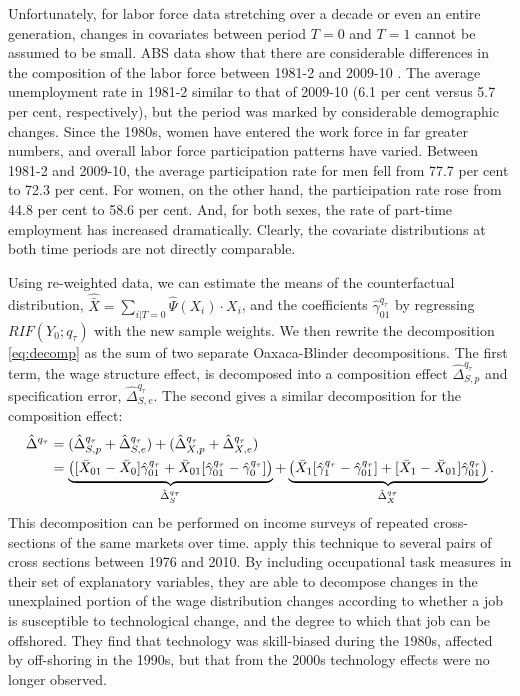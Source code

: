 Unfortunately, for labor force data stretching over a decade or even an entire generation, changes in covariates between period $T=0$ and $T=1$ cannot be assumed to be small. ABS data show that there are considerable differences in the composition of the labor force between 1981-2 and 2009-10 \citep{LFSApr2013}. The average unemployment rate in 1981-2 similar to that of 2009-10 (6.1 per cent versus 5.7 per cent, respectively), but the period was marked by considerable demographic changes. Since the 1980s, women have entered the work force in far greater numbers, and overall labor force participation patterns have varied. Between 1981-2 and 2009-10, the average participation rate for men fell from 77.7 per cent to 72.3 per cent. For women, on the other hand, the participation rate rose from 44.8 per cent to 58.6 per cent. And, for both sexes, the rate of part-time employment has increased dramatically. Clearly, the covariate distributions at both time periods are not directly comparable.

Using re-weighted data, we can estimate the means of the counterfactual distribution, $\hat{\bar{X}}=\sum_{i|T=0}\hat{\Psi}(X_i) \cdot X_i$, and the coefficients $\hat{\gamma}_{01}^{q_\tau}$ by regressing $RIF(Y_0;q_\tau)$ with the new sample weights. We then rewrite the decomposition \eqref{eq:decomp} as the sum of two separate Oaxaca-Blinder decompositions. The first term, the wage structure effect, is decomposed into a composition effect $\hat{\Delta}^{q_\tau}_{S,p}$ and specification error, $\hat{\Delta}^{q_\tau}_{S,e}$. The second gives a similar decomposition for the composition effect:
\begin{align*}
  \hat{\Delta}^{q_\tau} &= (\hat{\Delta}^{q_\tau}_{S,p} + \hat{\Delta}^{q_\tau}_{S,e}) + (\hat{\Delta}^{q_\tau}_{X,p} + \hat{\Delta}^{q_\tau}_{X,e}) \notag \\
  &= \underbrace{\left( [\bar{X}_{01} - \bar{X}_0 ] \hat{\gamma}^{q_\tau}_{01} +
    \bar{X}_{01}[\hat{\gamma}_{01}^{q_\tau} - \hat{\gamma}_0^{q_\tau}] \right)}_{\hat{\Delta}^{q_\tau}_{S}} +
  \underbrace{\left( \bar{X}_{1}[\hat{\gamma}_{1}^{q_\tau} - \hat{\gamma}_{01}^{q_\tau}] + 
    [\bar{X}_{1} - \bar{X}_{01} ] \hat{\gamma}^{q_\tau}_{01}\right)}_{\hat{\Delta}^{q_\tau}_{X}}.
\end{align*}
This decomposition can be performed on income surveys of repeated cross-sections of the same markets over time. \citet{Firpo2011} apply this technique to several pairs of cross sections between 1976 and 2010. By including occupational task measures in their set of explanatory variables, they are able to decompose changes in the unexplained portion of the wage distribution changes according to whether a job is susceptible to technological change, and the degree to which that job can be offshored. They find that technology was skill-biased during the 1980s, affected by off-shoring in the 1990s, but that from the 2000s technology effects were no longer observed.

